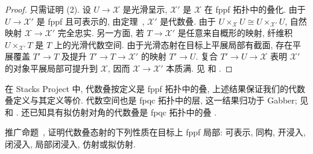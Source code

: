 \begin{proof}
只需证明 (2). 设 $U\to\mathcal X$ 是光滑呈示, $\mathcal X'$ 是 $\mathcal X$ 在 fppf 拓扑中的叠化. 由于 $U\to\mathcal X'$ 是 fppf 且可表示的, 由定理~, $\mathcal X'$ 是代数叠. 由于 $U\times_{\mathcal X}U\cong U\times_{\mathcal X'}U$, 自然映射 $\mathcal X\to\mathcal X'$ 完全忠实. 另一方面, 若 $T\to\mathcal X'$ 是任意来自概形的映射, 纤维积 $U\times_{\mathcal X'}T$ 是 $T$ 上的光滑代数空间. 由于光滑态射在目标上平展局部有截面, 存在平展覆盖 $T'\to T$ 及提升 $T'\to T\to\mathcal X'$ 的映射 $T'\to U$. 复合 $T'\to U\to\mathcal X$ 表明 $\mathcal X'$ 的对象平展局部可提升到 $\mathcal X$, 因而 $\mathcal X\to\mathcal X'$ 本质满. 见 \cite[推论 10.7(a)]{LMB00} 和 \cite[Tag 076V]{SP}.
\end{proof}
\begin{remark}\label{src:7.3.4}
在 Stacks Project \cite{SP} 中, 代数叠按定义是 fppf 拓扑中的叠, 上述结果保证我们的代数叠定义与其定义等价. 代数空间也是 fpqc 拓扑中的层, 这一结果归功于 Gabber; 见 \cite[定理 A.4]{LMB00} 和 \cite[Tag 0APL]{SP}. 还已知具有拟仿射对角的代数叠是 fpqc 拓扑中的叠 \cite[推论 10.7(b)]{LMB00}.
\end{remark}
\begin{exercise}\label{src:7.3.5}
推广命题~, 证明代数叠态射的下列性质在目标上 fppf 局部: 可表示, 同构, 开浸入, 闭浸入, 局部闭浸入, 仿射或拟仿射.
\end{exercise}
